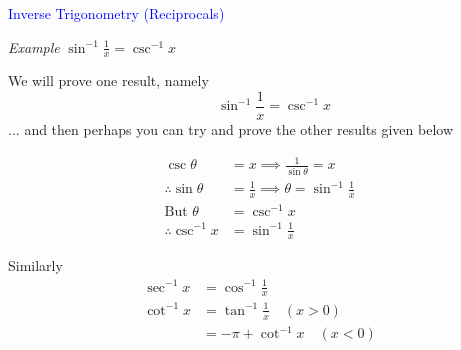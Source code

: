 \documentclass[14pt,fleqn]{extarticle}
\begin{document}
\begin{skill}
\textcolor{blue}{Inverse Trigonometry (Reciprocals)}

\textit{Example } $\sin^{-1}\frac{1}{x} = \csc^{-1} x$ 
\end{skill}

\newcard 

We will prove one result, namely
\[ \qquad \sin^{-1}\frac{1}{x} = \csc^{-1} x\]
$\ldots$ and then perhaps you can try and prove the other results given below

%
\begin{align}
\csc\theta &= x \implies \frac{1}{\sin\theta} =x \\
\therefore \sin\theta &= \frac{1}{x} 
\implies \theta = \sin^{-1}\frac{1}{x} \\
\text{But }\theta &= \csc^{-1} x \\
\therefore \csc^{-1}x &= \sin^{-1}\frac{1}{x} 
\end{align}

Similarly 
%
\begin{align}
\sec^{-1} x &= \cos^{-1}\frac{1}{x} \\ 
\cot^{-1} x &= \tan^{-1}\frac{1}{x} \quad (x >  0) \\
&= -\pi + \cot^{-1} x \quad (x < 0) 
\end{align}
\end{document}

